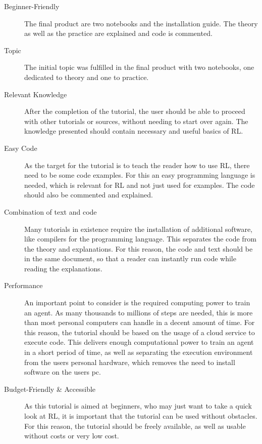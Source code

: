 \documentclass[10pt,a4paper]{article}
\begin{document}
		
		\begin{description}
		\item[Beginner-Friendly] The final product are two notebooks and the installation guide. The theory as well as the practice are explained and code is commented. 
		\item[Topic] The initial topic was fulfilled in the final product with two notebooks, one dedicated to theory and one to practice. 
		
		\item[Relevant Knowledge] After the completion of the tutorial, the user should be able to proceed with other tutorials or sources, without needing to start over again. The knowledge presented should contain necessary and useful basics of RL.
		
		\item[Easy Code] As the target for the tutorial is to teach the reader how to use RL, there need to be some code examples. For this an easy programming language is needed, which is relevant for RL and not just used for examples. The code should also be commented and explained.\\ 
		
		\item[Combination of text and code] Many tutorials in existence require the installation of additional software, like compilers for the programming language. This separates the code from the theory and explanations. For this reason, the code and text should be in the same document, so that a reader can instantly run code while reading the explanations. 
		
		\item[Performance] An important point to consider is the required computing power to train an agent. As many thousands to millions of steps are needed, this is more than most personal computers can handle in a decent amount of time.  
		For this reason, the tutorial should be based on the usage of a cloud service to execute code. 
		This delivers enough computational power to train an agent in a short period of time, as well as separating the execution environment from the users personal hardware, which removes the need to install software on the users pc.
		
		\item[Budget-Friendly \& Accessible] As this tutorial is aimed at beginners, who may just want to take a quick look at RL, it is important that the tutorial can be used without obstacles. For this reason, the tutorial should be freely available, as well as usable without costs or very low cost.
	\end{description}
\end{document}
